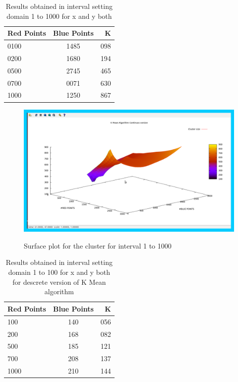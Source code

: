 \documentclass[12pt,a4wide]{report}
\theoremstyle{plain}
\theoremstyle{definition}
\theoremstyle{remark}
\begin{document}
 \begin{table}[H]
\centering
\caption{Results obtained in interval setting domain 1 to 1000 for x and y both}
 \begin{tabular}{||l|c|r||} \hline
 Red Points & Blue Points & K \\ \hline
 0100 & 1485 & 098 \\ \hline
 0200 & 1680 & 194 \\ \hline
 0500 & 2745 & 465 \\ \hline
 0700 & 0071 & 630 \\ \hline
 1000 & 1250 & 867 \\ \hline
 \end{tabular}
 \end{table}
 
\begin{figure}[H]
 \caption{Surface plot for the cluster for interval 1 to 1000}
  \centering
\scalebox{0.3}
{\includegraphics{avg1000.png}}
\end{figure}

 \begin{table}[H]
\centering
\caption{Results obtained in interval setting domain 1 to 100 for x and y both for descrete version of K Mean algorithm}
 \begin{tabular}{||l|c|r||} \hline
 Red Points & Blue Points & K \\ \hline
 100 & 140 & 056 \\ \hline
 200 & 168 & 082 \\ \hline
 500 & 185 & 121 \\ \hline
 700 & 208 & 137 \\ \hline
 1000& 210 & 144 \\ \hline
 \end{tabular}
 \end{table}
\end{document}
